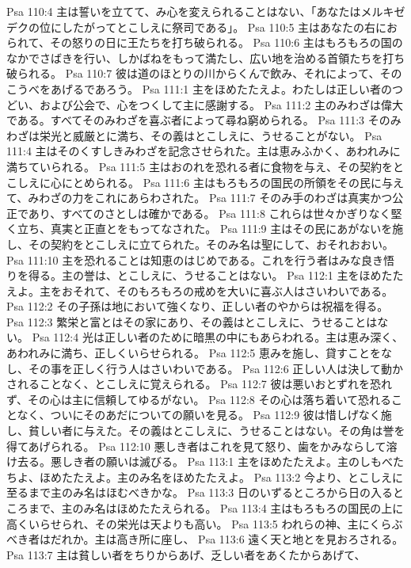 Psa 110:4  主は誓いを立てて、み心を変えられることはない、「あなたはメルキゼデクの位にしたがってとこしえに祭司である」。
Psa 110:5  主はあなたの右におられて、その怒りの日に王たちを打ち破られる。
Psa 110:6  主はもろもろの国のなかでさばきを行い、しかばねをもって満たし、広い地を治める首領たちを打ち破られる。
Psa 110:7  彼は道のほとりの川からくんで飲み、それによって、そのこうべをあげるであろう。
Psa 111:1  主をほめたたえよ。わたしは正しい者のつどい、および公会で、心をつくして主に感謝する。
Psa 111:2  主のみわざは偉大である。すべてそのみわざを喜ぶ者によって尋ね窮められる。
Psa 111:3  そのみわざは栄光と威厳とに満ち、その義はとこしえに、うせることがない。
Psa 111:4  主はそのくすしきみわざを記念させられた。主は恵みふかく、あわれみに満ちていられる。
Psa 111:5  主はおのれを恐れる者に食物を与え、その契約をとこしえに心にとめられる。
Psa 111:6  主はもろもろの国民の所領をその民に与えて、みわざの力をこれにあらわされた。
Psa 111:7  そのみ手のわざは真実かつ公正であり、すべてのさとしは確かである。
Psa 111:8  これらは世々かぎりなく堅く立ち、真実と正直とをもってなされた。
Psa 111:9  主はその民にあがないを施し、その契約をとこしえに立てられた。そのみ名は聖にして、おそれおおい。
Psa 111:10  主を恐れることは知恵のはじめである。これを行う者はみな良き悟りを得る。主の誉は、とこしえに、うせることはない。
Psa 112:1  主をほめたたえよ。主をおそれて、そのもろもろの戒めを大いに喜ぶ人はさいわいである。
Psa 112:2  その子孫は地において強くなり、正しい者のやからは祝福を得る。
Psa 112:3  繁栄と富とはその家にあり、その義はとこしえに、うせることはない。
Psa 112:4  光は正しい者のために暗黒の中にもあらわれる。主は恵み深く、あわれみに満ち、正しくいらせられる。
Psa 112:5  恵みを施し、貸すことをなし、その事を正しく行う人はさいわいである。
Psa 112:6  正しい人は決して動かされることなく、とこしえに覚えられる。
Psa 112:7  彼は悪いおとずれを恐れず、その心は主に信頼してゆるがない。
Psa 112:8  その心は落ち着いて恐れることなく、ついにそのあだについての願いを見る。
Psa 112:9  彼は惜しげなく施し、貧しい者に与えた。その義はとこしえに、うせることはない。その角は誉を得てあげられる。
Psa 112:10  悪しき者はこれを見て怒り、歯をかみならして溶け去る。悪しき者の願いは滅びる。
Psa 113:1  主をほめたたえよ。主のしもべたちよ、ほめたたえよ。主のみ名をほめたたえよ。
Psa 113:2  今より、とこしえに至るまで主のみ名はほむべきかな。
Psa 113:3  日のいずるところから日の入るところまで、主のみ名はほめたたえられる。
Psa 113:4  主はもろもろの国民の上に高くいらせられ、その栄光は天よりも高い。
Psa 113:5  われらの神、主にくらぶべき者はだれか。主は高き所に座し、
Psa 113:6  遠く天と地とを見おろされる。
Psa 113:7  主は貧しい者をちりからあげ、乏しい者をあくたからあげて、
